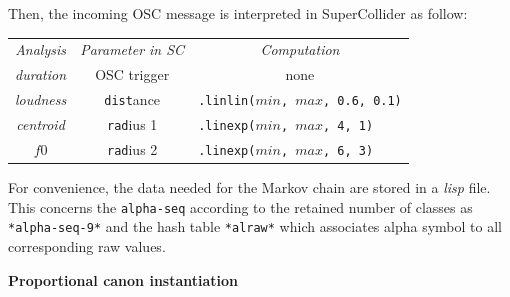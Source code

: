 \bigskip
\noindent Then, the incoming OSC message is interpreted in SuperCollider as follow:

\bigskip

\begin{tabular}{c|c|l}
\rowcolor{lightgray} \textit{Analysis}  & \textit{Parameter in SC}  & \multicolumn{1}{c}{\textit{Computation}}\\
\textsl{duration} &  OSC trigger   & \multicolumn{1}{c}{none}  \\
\textsl{loudness} &  \texttt{dist}ance   &  \texttt{.linlin($min$, $max$, 0.6, 0.1)} \\
\textsl{centroid} & \texttt{rad}ius 1 & \texttt{.linexp($min$, $max$, 4, 1)}\\
$f0$ & \texttt{rad}ius 2 & \texttt{.linexp($min$, $max$, 6, 3)} \\
\end{tabular}
\label{tab:apc}

  \bigskip

 For convenience, the data needed for the Markov chain are stored in a \textsl{lisp} file. This concerns the \texttt{alpha-seq} according to the retained number of classes as \texttt{*alpha-seq-9*} and the hash table \texttt{*alraw*} which associates alpha symbol to all corresponding raw values.

\bigskip
\smallskip
  
  \textbf{
  Proportional canon instantiation }
  

